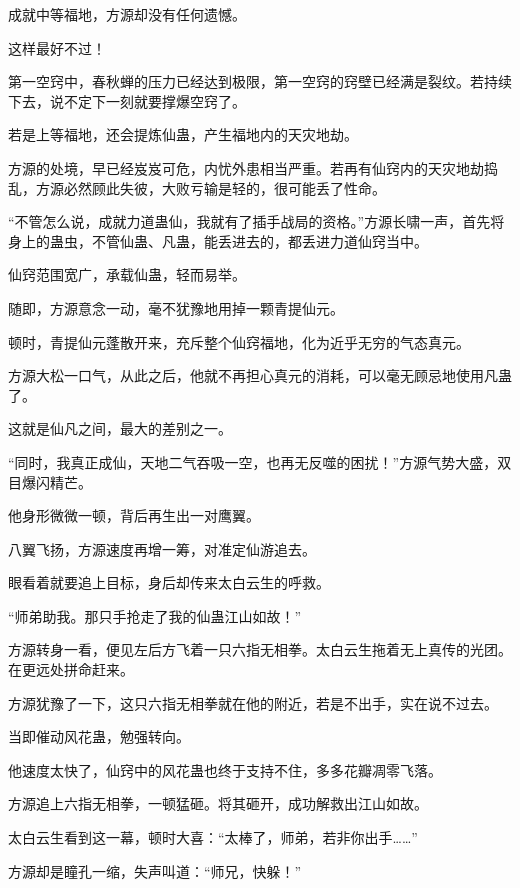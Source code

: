 
\begin{this_body}



成就中等福地，方源却没有任何遗憾。

这样最好不过！

第一空窍中，春秋蝉的压力已经达到极限，第一空窍的窍壁已经满是裂纹。若持续下去，说不定下一刻就要撑爆空窍了。

若是上等福地，还会提炼仙蛊，产生福地内的天灾地劫。

方源的处境，早已经岌岌可危，内忧外患相当严重。若再有仙窍内的天灾地劫捣乱，方源必然顾此失彼，大败亏输是轻的，很可能丢了性命。

“不管怎么说，成就力道蛊仙，我就有了插手战局的资格。”方源长啸一声，首先将身上的蛊虫，不管仙蛊、凡蛊，能丢进去的，都丢进力道仙窍当中。

仙窍范围宽广，承载仙蛊，轻而易举。

随即，方源意念一动，毫不犹豫地用掉一颗青提仙元。

顿时，青提仙元蓬散开来，充斥整个仙窍福地，化为近乎无穷的气态真元。

方源大松一口气，从此之后，他就不再担心真元的消耗，可以毫无顾忌地使用凡蛊了。

这就是仙凡之间，最大的差别之一。

“同时，我真正成仙，天地二气吞吸一空，也再无反噬的困扰！”方源气势大盛，双目爆闪精芒。

他身形微微一顿，背后再生出一对鹰翼。

八翼飞扬，方源速度再增一筹，对准定仙游追去。

眼看着就要追上目标，身后却传来太白云生的呼救。

“师弟助我。那只手抢走了我的仙蛊江山如故！”

方源转身一看，便见左后方飞着一只六指无相拳。太白云生拖着无上真传的光团。在更远处拼命赶来。

方源犹豫了一下，这只六指无相拳就在他的附近，若是不出手，实在说不过去。

当即催动风花蛊，勉强转向。

他速度太快了，仙窍中的风花蛊也终于支持不住，多多花瓣凋零飞落。

方源追上六指无相拳，一顿猛砸。将其砸开，成功解救出江山如故。

太白云生看到这一幕，顿时大喜：“太棒了，师弟，若非你出手……”

方源却是瞳孔一缩，失声叫道：“师兄，快躲！”


\end{this_body}
